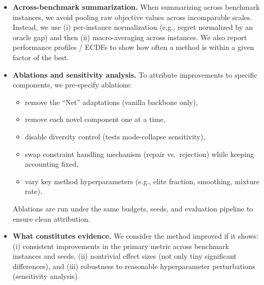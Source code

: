 \begin{itemize}
    \item \textbf{Across-benchmark summarization.}
    When summarizing across benchmark instances, we avoid pooling raw objective values across incomparable scales.
    Instead, we use (i) per-instance normalization (e.g., regret normalized by an oracle gap) and then (ii) macro-averaging across instances.
    We also report performance profiles / ECDFs to show how often a method is within a given factor of the best.

    \item \textbf{Ablations and sensitivity analysis.}
    To attribute improvements to specific components, we pre-specify ablations:
    \begin{itemize}
        \item remove the ``Net'' adaptations (vanilla backbone only),
        \item remove each novel component one at a time,
        \item disable diversity control (tests mode-collapse sensitivity),
        \item swap constraint handling mechanism (repair vs.\ rejection) while keeping accounting fixed,
        \item vary key method hyperparameters (e.g., elite fraction, smoothing, mixture rate).
    \end{itemize}
    Ablations are run under the same budgets, seeds, and evaluation pipeline to ensure clean attribution.

    \item \textbf{What constitutes evidence.}
    We consider the method improved if it shows:
    (i) consistent improvements in the primary metric across benchmark instances and seeds,
    (ii) nontrivial effect sizes (not only tiny significant differences),
    and (iii) robustness to reasonable hyperparameter perturbations (sensitivity analysis).
\end{itemize}

